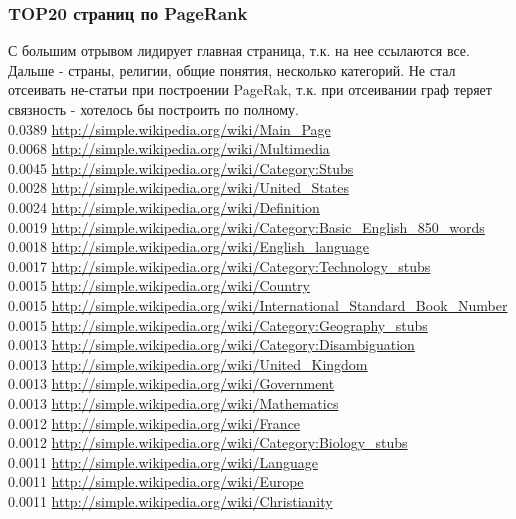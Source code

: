 \documentclass[12pt]{article}
\begin{document}
\subsubsection*{TOP20 страниц по PageRank}
С большим отрывом лидирует главная страница, т.к. на нее ссылаются все. Дальше - страны, религии, общие понятия, несколько категорий. Не стал отсеивать не-статьи при построении PageRak, т.к. при отсеивании граф теряет связность - хотелось бы построить по полному. \\
0.0389 \url{http://simple.wikipedia.org/wiki/Main_Page}\\
0.0068 \url{http://simple.wikipedia.org/wiki/Multimedia}\\
0.0045 \url{http://simple.wikipedia.org/wiki/Category:Stubs}\\
0.0028 \url{http://simple.wikipedia.org/wiki/United_States}\\
0.0024 \url{http://simple.wikipedia.org/wiki/Definition}\\
0.0019 \url{http://simple.wikipedia.org/wiki/Category:Basic_English_850_words}\\
0.0018 \url{http://simple.wikipedia.org/wiki/English_language}\\
0.0017 \url{http://simple.wikipedia.org/wiki/Category:Technology_stubs}\\
0.0015 \url{http://simple.wikipedia.org/wiki/Country}\\
0.0015 \url{http://simple.wikipedia.org/wiki/International_Standard_Book_Number}\\
0.0015 \url{http://simple.wikipedia.org/wiki/Category:Geography_stubs}\\
0.0013 \url{http://simple.wikipedia.org/wiki/Category:Disambiguation}\\
0.0013 \url{http://simple.wikipedia.org/wiki/United_Kingdom}\\
0.0013 \url{http://simple.wikipedia.org/wiki/Government}\\
0.0013 \url{http://simple.wikipedia.org/wiki/Mathematics}\\
0.0012 \url{http://simple.wikipedia.org/wiki/France}\\
0.0012 \url{http://simple.wikipedia.org/wiki/Category:Biology_stubs}\\
0.0011 \url{http://simple.wikipedia.org/wiki/Language}\\
0.0011 \url{http://simple.wikipedia.org/wiki/Europe}\\
0.0011 \url{http://simple.wikipedia.org/wiki/Christianity}\\
\end{document}
